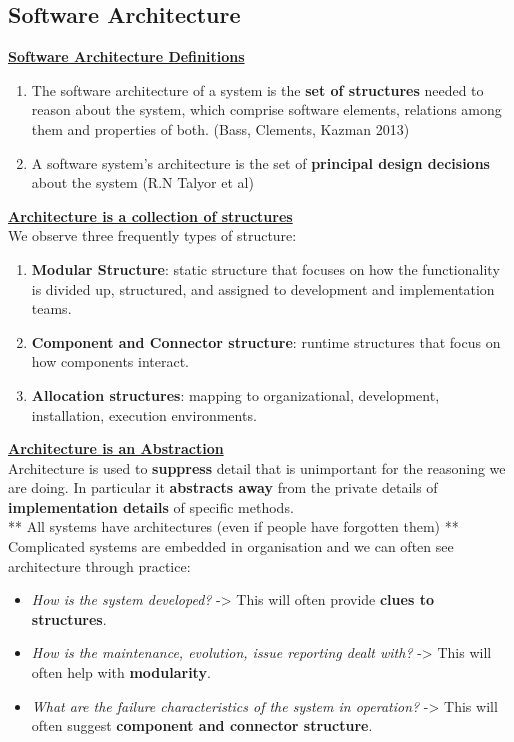 \documentclass[a4paper]{article}
\begin{document}
\subsection{Software Architecture}

\underline{\textbf{Software Architecture Definitions}}
\begin{enumerate}
\item The software architecture of a system is the \textbf{set of structures} needed to reason about the system, which comprise software elements, relations among them and properties of both. (Bass, Clements, Kazman 2013)
\item A software system's architecture is the set of \textbf{principal design decisions} about the system (R.N Talyor et al)\\
\end{enumerate}

\underline{\textbf{Architecture is a collection of structures}}\\
We observe three frequently types of structure:
\begin{enumerate}
\item \textbf{Modular Structure}: static structure that focuses on how the functionality is divided up, structured, and assigned to development and implementation teams.
\item \textbf{Component and Connector structure}: runtime structures that focus on how components interact.
\item \textbf{Allocation structures}: mapping to organizational, development, installation, execution environments.\\
\end{enumerate}

\underline{\textbf{Architecture is an Abstraction}}\\

Architecture is used to \textbf{suppress} detail that is unimportant for the reasoning we are doing. In particular it \textbf{abstracts away} from the private details of \textbf{implementation details} of specific methods.\\

** All systems have architectures (even if people have forgotten them) **\\

Complicated systems are embedded in organisation and we can often see architecture through practice:
\begin{itemize}
\item \textit{How is the system developed?} -> This will often provide \textbf{clues to structures}.
\item \textit{How is the maintenance, evolution, issue reporting dealt with?} -> This will often help with \textbf{modularity}.
\item \textit{What are the failure characteristics of the system in operation?} -> This will often suggest \textbf{component and connector structure}.
\end{itemize}
\end{document}
